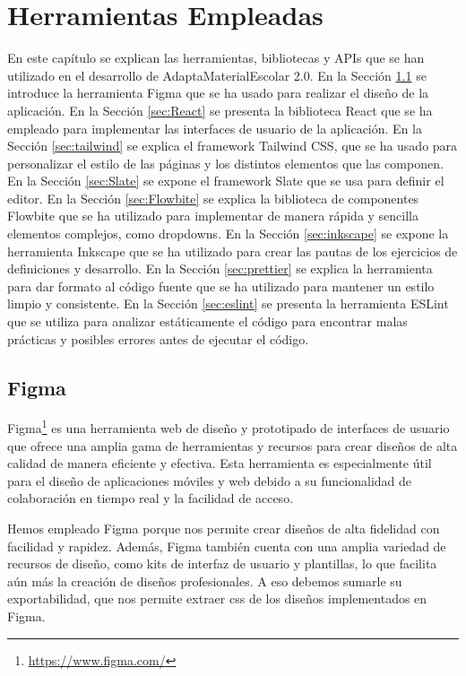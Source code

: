 \chapter{Herramientas Empleadas}\label{cap:herramientas}

En este capítulo se explican las herramientas, bibliotecas y APIs que se han utilizado en el desarrollo de AdaptaMaterialEscolar 2.0. En la Sección \ref{sec:Figma} se introduce la herramienta Figma que se ha usado para realizar el diseño de la aplicación. En la Sección \ref{sec:React} se presenta la biblioteca React que se ha empleado para implementar las interfaces de usuario de la aplicación. En la Sección \ref{sec:tailwind} se explica el framework Tailwind CSS, que se ha usado para personalizar el estilo de las páginas y los distintos elementos que las componen. En la Sección \ref{sec:Slate} se expone el framework Slate que se usa para definir el editor. En la Sección \ref{sec:Flowbite} se explica la biblioteca de componentes Flowbite que se ha utilizado para implementar de manera rápida y sencilla elementos complejos, como dropdowns. En la Sección \ref{sec:inkscape} se expone la herramienta Inkscape que se ha utilizado para crear las pautas de los ejercicios de definiciones y desarrollo. En la Sección \ref{sec:prettier} se explica la herramienta para dar formato al código fuente que se ha utilizado para mantener un estilo limpio y consistente. En la Sección \ref{sec:eslint} se presenta la herramienta ESLint que se utiliza para analizar estáticamente el código para encontrar malas prácticas y posibles errores antes de ejecutar el código.

\section{Figma}\label{sec:Figma}
Figma\footnote{\url{https://www.figma.com/}} es una herramienta web de diseño y prototipado de interfaces de usuario que ofrece una amplia gama de herramientas y recursos para crear diseños de alta calidad de manera eficiente y efectiva. Esta herramienta es especialmente útil para el diseño de aplicaciones móviles y web debido a su funcionalidad de colaboración en tiempo real y la facilidad de acceso.

Hemos empleado Figma porque nos permite crear diseños de alta fidelidad con facilidad y rapidez. Además, Figma también cuenta con una amplia variedad de recursos de diseño, como kits de interfaz de usuario y plantillas, lo que facilita aún más la creación de diseños profesionales. A eso debemos sumarle su exportabilidad, que nos permite extraer css de los diseños implementados en Figma.

